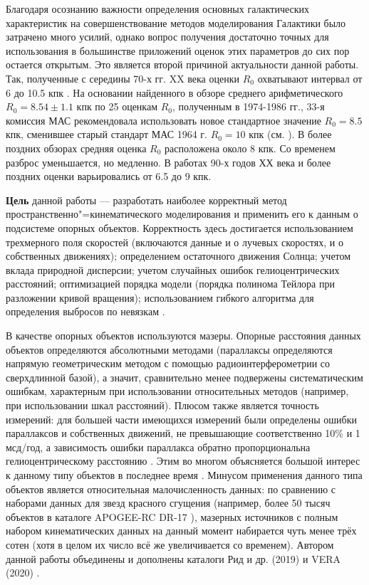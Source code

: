\documentclass[a4paper, oneside, 14pt]{article}
\begin{document}
Благодаря осознанию важности определения основных галактических характеристик на совершенствование методов моделирования Галактики было затрачено много усилий, однако вопрос получения достаточно точных для использования в большинстве приложений оценок этих параметров до сих пор остается открытым. Это является второй причиной актуальности данной работы. Так, полученные с середины 70-х гг. XX века оценки $ R_0 $ охватывают интервал от 6 до 10.5 кпк \cite{K.L.1986, F.1987, R.1993}. На основании найденного в обзоре \cite{K.L.1986} среднего арифметического $ R_0 = 8.54 \pm 1.1 $ кпк по 25 оценкам $ R_0 $, полученным в 1974-1986 гг., 33-я комиссия МАС рекомендовала использовать новое стандартное значение $ R_0 = 8.5 $ кпк, сменившее старый стандарт МАС 1964 г. $ R_0 = 10 $ кпк (см. \cite{F.T.1991}). В более поздних обзорах \cite{R.1993, N.2004} средняя оценка $ R_0 $ расположена около 8 кпк. Со временем разброс уменьшается, но медленно. В работах 90-х годов ХХ века и более поздних оценки варьировались от 6.5 до 9 кпк.

\textbf{Цель} данной работы --- разработать наиболее корректный метод пространственно"=кинематического моделирования и применить его к данным о подсистеме опорных объектов. Корректность здесь достигается использованием трехмерного поля скоростей (включаются данные и о лучевых скоростях, и о собственных движениях); определением остаточного движения Солнца; учетом вклада природной дисперсии; учетом случайных ошибок гелиоцентрических расстояний; оптимизацией порядка модели (порядка полинома Тейлора при разложении кривой вращения); использованием гибкого алгоритма для определения выбросов по невязкам \cite{N.2012}.

В качестве опорных объектов используются мазеры. Опорные расстояния данных объектов определяются абсолютными методами (параллаксы определяются напрямую геометрическим методом с помощью радиоинтерферометрии со сверхдлинной базой), а значит, сравнительно менее подвержены систематическим ошибкам, характерным при использовании относительных методов (например, при использовании шкал расстояний). Плюсом также является точность измерений: для большей части имеющихся измерений были определены ошибки параллаксов и собственных движений, не превышающие соответственно 10\% и 1 мсд/год, а зависимость ошибки параллакса обратно пропорциональна гелиоцентрическому расстоянию \cite{N.V.2018}. Этим во многом объясняется большой интерес к данному типу объектов в последнее время \cite{R.2009, R.2014, R.2019, B.B.2014, B.B.2015}. Минусом применения данного типа объектов является относительная малочисленность данных: по сравнению с наборами данных для звезд красного сгущения \cite{V.2019} (например, более 50 тысяч объектов в каталоге APOGEE-RC DR-17 \cite{DR17-APOGEE}), мазерных источников с полным набором кинематических данных на данный момент набирается чуть менее трёх сотен (хотя в целом их число всё же увеличивается со временем). Автором данной работы объединены и дополнены каталоги Рид и др. (2019) \cite{R.2019} и VERA (2020) \cite{VERA.2020}.
\end{document}
